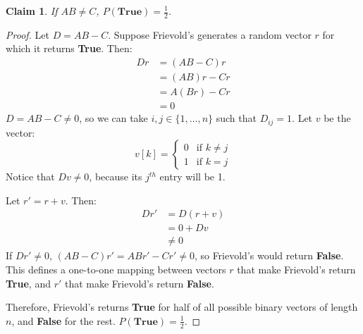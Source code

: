 \documentclass[11pt]{article}
\theoremstyle{plain}
\newtheorem{claim}{Claim}
\theoremstyle{definition}
\begin{document}
\begin{claim}
    If $AB \neq C$, $P(\textbf{True}) = \displaystyle\frac{1}{2}$.
\end{claim}

\begin{proof}
    Let $D = AB - C$. Suppose Frievold's generates a random vector $r$ for which it returns 
    \textbf{True}. Then:
    \begin{align*} 
        Dr &= (AB - C)r\\
           &= (AB)r - Cr\\
           &= A(Br) - Cr\\
           &= 0
    \end{align*}
    $D = AB - C \neq 0$, so we can take $i, j \in \{1, \ldots, n\}$ such that
    $D_{ij} = 1$. Let $v$ be the vector:
    \[
        v[k] = 
        \begin{cases}
            0 & \text{if } k \neq j\\
            1 & \text{if } k = j
        \end{cases}
    \]
    Notice that $Dv \neq 0$, because its $j^{th}$ entry will be 1.

    Let $r' = r + v$. Then:
    \begin{align*}
        Dr' &= D(r + v)\\
            &= 0 + Dv\\
            &\neq 0
    \end{align*}
    If $Dr' \neq 0$, $(AB - C)r' = ABr' - Cr' \neq 0$, so Frievold's would return \textbf{False}.
    This defines a one-to-one mapping between vectors $r$ that make Frievold's return \textbf{True},
    and $r'$ that make Frievold's return \textbf{False}.

    Therefore, Frievold's returns \textbf{True} for half of all possible binary vectors of length 
    $n$, and \textbf{False} for the rest. $P(\textbf{True}) = \frac{1}{2}$.
\end{proof}
\end{document}
